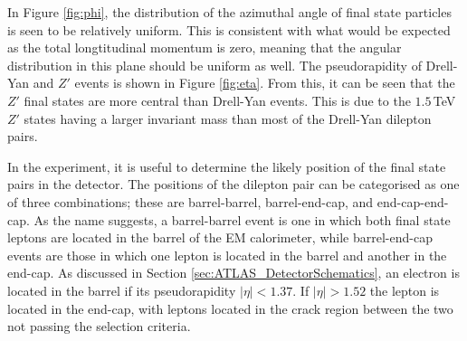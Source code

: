 \documentclass{article}
\begin{document}
In Figure \ref{fig:phi}, the distribution of the azimuthal angle of final state particles is seen to be relatively uniform. This is consistent with what would be expected as the total longtitudinal momentum is zero, meaning that the angular distribution in this plane should be uniform as well. The pseudorapidity of Drell-Yan and $Z'$ events is shown in Figure \ref{fig:eta}. From this, it can be seen that the $Z'$ final states are more central than Drell-Yan events. This is due to the $1.5\,$TeV $Z'$ states having a larger invariant mass than most of the Drell-Yan dilepton pairs.

In the experiment, it is useful to determine the likely position of the final state pairs in the detector. The positions of the dilepton pair can be categorised as one of three combinations; these are barrel-barrel, barrel-end-cap, and end-cap-end-cap. As the name suggests, a barrel-barrel event is one in which both final state leptons are located in the barrel of the EM calorimeter, while barrel-end-cap events are those in which one lepton is located in the barrel and another in the end-cap. As discussed in Section \ref{sec:ATLAS_DetectorSchematics}, an electron is located in the barrel if its pseudorapidity $|\eta|<1.37$. If $|\eta|>1.52$ the lepton is located in the end-cap, with leptons located in the crack region between the two not passing the selection criteria.
\end{document}
